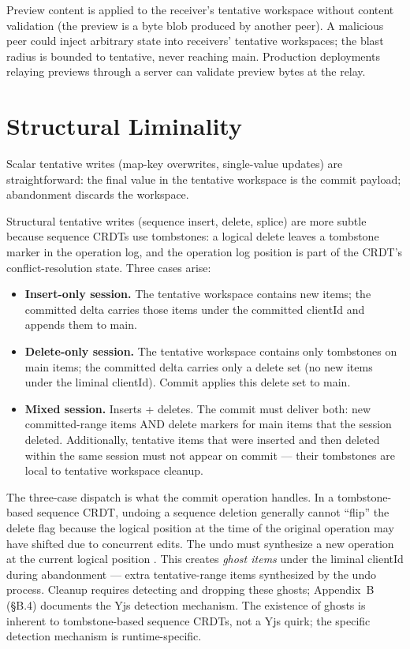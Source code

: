 Preview content is applied to the receiver's tentative workspace without content validation (the preview is a byte blob produced by another peer). A malicious peer could inject arbitrary state into receivers' tentative workspaces; the blast radius is bounded to tentative, never reaching main. Production deployments relaying previews through a server can validate preview bytes at the relay.

\section{Structural Liminality}

Scalar tentative writes (map-key overwrites, single-value updates) are straightforward: the final value in the tentative workspace is the commit payload; abandonment discards the workspace.

Structural tentative writes (sequence insert, delete, splice) are more subtle because sequence CRDTs use tombstones: a logical delete leaves a tombstone marker in the operation log, and the operation log position is part of the CRDT's conflict-resolution state. Three cases arise:

\begin{itemize}
    \item \textbf{Insert-only session.} The tentative workspace contains new items; the committed delta carries those items under the committed clientId and appends them to main.
    \item \textbf{Delete-only session.} The tentative workspace contains only tombstones on main items; the committed delta carries only a delete set (no new items under the liminal clientId). Commit applies this delete set to main.
    \item \textbf{Mixed session.} Inserts + deletes. The commit must deliver both: new committed-range items AND delete markers for main items that the session deleted. Additionally, tentative items that were inserted and then deleted within the same session must not appear on commit --- their tombstones are local to tentative workspace cleanup.
\end{itemize}

The three-case dispatch is what the commit operation handles. In a tombstone-based sequence CRDT, undoing a sequence deletion generally cannot ``flip'' the delete flag because the logical position at the time of the original operation may have shifted due to concurrent edits. The undo must synthesize a new operation at the current logical position \cite{yu2019opodis, yjs:internals}. This creates \emph{ghost items} under the liminal clientId during abandonment --- extra tentative-range items synthesized by the undo process. Cleanup requires detecting and dropping these ghosts; Appendix~B (\S B.4) documents the Yjs detection mechanism. The existence of ghosts is inherent to tombstone-based sequence CRDTs, not a Yjs quirk; the specific detection mechanism is runtime-specific.

